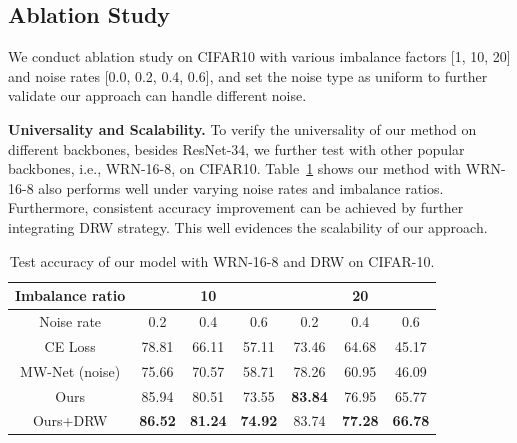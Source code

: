 \documentclass[letterpaper]{article} %
\newcommand{\bd}[1]{\textbf{#1}}
\begin{document}
\subsection{Ablation Study}

We conduct ablation study on CIFAR10 with various imbalance factors [1, 10, 20] and noise rates [0.0, 0.2, 0.4, 0.6], and set the noise type as uniform to further validate our approach can handle different noise.

\noindent
\bd{Universality and Scalability.} 
To verify the universality of our method on different backbones, besides ResNet-34, we further test with other popular backbones, i.e., WRN-16-8, on CIFAR10.
Table~\ref{tab:cifar10_wrn} shows our method with WRN-16-8
also performs well under varying noise rates and imbalance ratios.
Furthermore, consistent accuracy improvement can be achieved by further integrating DRW strategy. 
This well evidences the scalability of our approach.
\begin{table}[h]
\vspace{-0.3cm}
\begin{center}
\begin{adjustbox}{max width=0.47\textwidth}
    \begin{tabular}{c|c|c|c|c|c|c}
    \hline
    Imbalance ratio & \multicolumn{3}{c|}{10}    & \multicolumn{3}{c}{20} \\
    \hline
    Noise rate  & 0.2   & 0.4 & 0.6  & 0.2   & 0.4 & 0.6 \\
    \hline
    CE Loss & 78.81 & 66.11 & 57.11 & 73.46 & 64.68 & 45.17 \\
    \hline
    MW-Net (noise) & 75.66 & 70.57 & 58.71 &   78.26    & 60.95 & 46.09 \\
    \hline
    Ours  & 85.94 & 80.51 & 73.55 & \bd{83.84} & 76.95 & 65.77 \\
    \hline
    Ours+DRW & \bd{86.52} & \bd{81.24} & \bd{74.92} & 83.74 & \bd{77.28} & \bd{66.78} \\
    \hline
    \end{tabular}%
\end{adjustbox}
\vspace{-0.3cm}
\caption{
Test accuracy of our model with  WRN-16-8 and DRW on CIFAR-10.
}
\label{tab:cifar10_wrn}
\vspace{-0.7cm}
\end{center}
\end{table}
\end{document}
